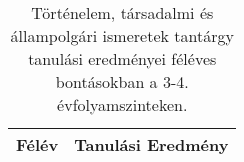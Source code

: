        
           \begin{longtable}{c | p{12cm} }
            \caption[Történelem, társadalmi és állampolgári ismeretek 3-4.]{Történelem, társadalmi és állampolgári ismeretek tantárgy tanulási eredményei féléves bontásokban a 3-4. évfolyamszinteken. }  \\

            \textbf{Félév} & \textbf{Tanulási Eredmény} \\
            \hline
            \endhead
                                
                                      
                                
                                      
                                
                                      
                                
                                      
                                
                                      
                        \end{longtable}
            \clearpage

